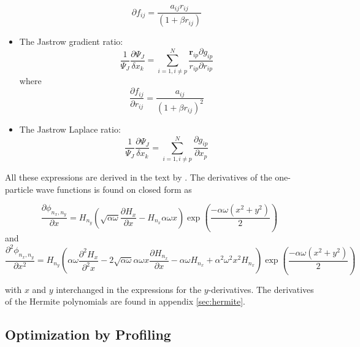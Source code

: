 \documentclass[aps,prb,twocolumn,floatfix]{revtex4}
\renewcommand{\vec}{\mathbf}
\begin{document}
\begin{itemize}
\begin{equation}
            \partial f_{ij} = \frac{a_{ij} r_{ij}}{(1 + \beta r_{ij})}
        \end{equation} 
        \item The Jastrow gradient ratio:
        \begin{equation}
            \frac{1}{\Psi_J} \frac{\partial \Psi_J}{\delta x_k} = \sum_{i=1,i\neq p}^{N} \frac{\vec r_{ip} \partial g_{ip}}{r_{ip} \partial r_{ip}}
        \end{equation} 
        where
        \begin{equation}
            \frac{\partial f_{ij}}{\partial r_{ij}} = \frac{a_{ij}}{(1 + \beta r_{ij})^2}
        \end{equation} 
        \item The Jastrow Laplace ratio:
        \begin{equation}
            \frac{1}{\Psi_J} \frac{\partial \Psi_J}{\delta x_k} = \sum_{i=1,i\neq p}^{N} \frac{\partial g_{ip}}{\partial x_{p}}
        \end{equation} 
\end{itemize}
All these expressions are derived in the text by \textcite{lecturenotes}. The derivatives of the one-particle wave functions is found on closed form as
\begin{widetext}
    \begin{equation}
        \frac{\partial \phi_{n_x,n_y}}{\partial x} = H_{n_y} \left (\sqrt{\alpha \omega} \frac{\partial H_x}{\partial x} - H_{n_x} \alpha \omega x \right) \exp \left(\frac{-\alpha \omega(x^2 + y^2)}{2} \right)
    \end{equation} 
    and 
    \begin{equation}
        \frac{\partial^2 \phi_{n_x,n_y}}{\partial x^2} = H_{n_y} \left (\alpha \omega \frac{\partial^2 H_x}{\partial^2 x} - 2\sqrt{\alpha \omega} \alpha \omega x \frac{\partial H_{n_x}}{\partial x} - \alpha \omega H_{n_x}  + \alpha^2 \omega^2 x^2 H_{n_x}  \right) \exp \left(\frac{-\alpha \omega(x^2 + y^2)}{2} \right)
    \end{equation}
\end{widetext}
with $x$ and $y$ interchanged in the expressions for the $y$-derivatives. The derivatives of the Hermite polynomials are found in appendix \ref{sec:hermite}.
                                                   


\subsection{Optimization by Profiling} \label{sec:optimizingprofiling}
\end{document}
